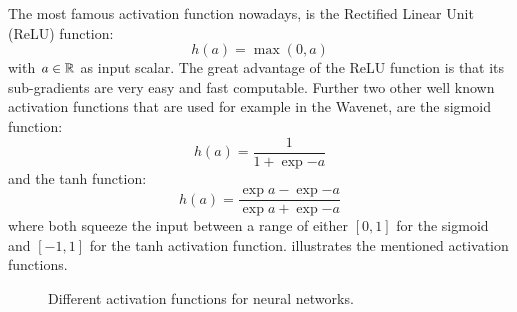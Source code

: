 The most famous activation function nowadays, is the Rectified Linear Unit (ReLU) \cite{Zeiler2013_relu} function:
\begin{equation}\label{eq:nn_theory_relu}
  h(a) = \max{(0, a)}
\end{equation}
with $a \in \mathbb{R}$ as input scalar.
The great advantage of the ReLU function is that its sub-gradients are very easy and fast computable.
Further two other well known activation functions that are used for example in the Wavenet, are the sigmoid function:
\begin{equation}\label{eq:nn_theory_sigmoid}
  h(a) = \frac{1}{1 + \exp{-a}}
\end{equation}
and the tanh function:
\begin{equation}\label{eq:nn_theory_tanh}
  h(a) = \frac{\exp{a} - \exp{-a}}{\exp{a} + \exp{-a}}
\end{equation}
where both squeeze the input between a range of either $[0, 1]$ for the sigmoid and $[-1, 1]$ for the tanh activation function.
 illustrates the mentioned activation functions.
\begin{figure}[!ht]
  \centering
    \quad
    \quad
  \caption{Different activation functions for neural networks.}
  \label{fig:nn_theory_activation}
\end{figure}
\FloatBarrier
\noindent


